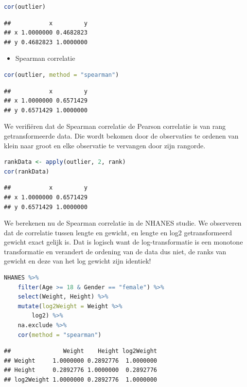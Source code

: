 \documentclass[
  12pt,dutch,coursenotes]{book}
\providecommand{\tightlist}{%
  \setlength{\itemsep}{0pt}\setlength{\parskip}{0pt}}
\theoremstyle{definition}
\theoremstyle{definition}
\theoremstyle{definition}
\theoremstyle{definition}
\theoremstyle{remark}
\begin{document}
\begin{lstlisting}[language=R]
cor(outlier)
\end{lstlisting}

\begin{lstlisting}
##           x         y
## x 1.0000000 0.4682823
## y 0.4682823 1.0000000
\end{lstlisting}

\begin{itemize}
\tightlist
\item
  Spearman correlatie
\end{itemize}

\begin{lstlisting}[language=R]
cor(outlier, method = "spearman")
\end{lstlisting}

\begin{lstlisting}
##           x         y
## x 1.0000000 0.6571429
## y 0.6571429 1.0000000
\end{lstlisting}

We verifiëren dat de Spearman correlatie de Pearson correlatie is van rang getransformeerde data. Die wordt bekomen door de observaties te ordenen van klein naar groot en elke observatie te vervangen door zijn rangorde.

\begin{lstlisting}[language=R]
rankData <- apply(outlier, 2, rank)
cor(rankData)
\end{lstlisting}

\begin{lstlisting}
##           x         y
## x 1.0000000 0.6571429
## y 0.6571429 1.0000000
\end{lstlisting}

We berekenen nu de Spearman correlatie in de NHANES studie.
We observeren dat de correlatie tussen lengte en gewicht, en lengte en log2 getransformeerd gewicht exact gelijk is.
Dat is logisch want de log-transformatie is een monotone transformatie en verandert de ordening van de data dus niet, de ranks van gewicht en deze van het log gewicht zijn identiek!

\begin{lstlisting}[language=R]
NHANES %>%
    filter(Age >= 18 & Gender == "female") %>%
    select(Weight, Height) %>%
    mutate(log2Weight = Weight %>%
        log2) %>%
    na.exclude %>%
    cor(method = "spearman")
\end{lstlisting}

\begin{lstlisting}
##               Weight    Height log2Weight
## Weight     1.0000000 0.2892776  1.0000000
## Height     0.2892776 1.0000000  0.2892776
## log2Weight 1.0000000 0.2892776  1.0000000
\end{lstlisting}
\end{document}
